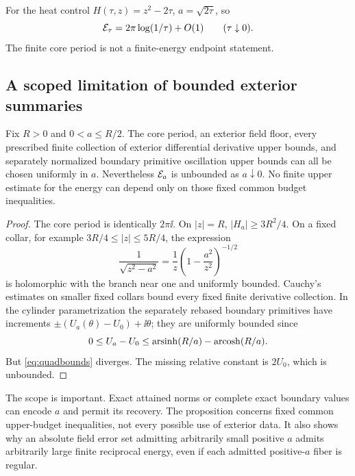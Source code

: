 For the heat control $H(\tau,z)=z^2-2\tau$, $a=\sqrt{2\tau}$, so
\begin{equation}\label{eq:quadheat}
 \mathcal E_\tau=2\pi\log(1/\tau)+O(1)
 \qquad(\tau\downarrow0).
\end{equation}
The finite core period is not a finite-energy endpoint statement.

\subsection{A scoped limitation of bounded exterior summaries}
\begin{proposition}\label{prop:compression}
Fix $R>0$ and $0<a\le R/2$. The core period, an exterior field floor,
every prescribed finite collection of exterior differential derivative
upper bounds, and separately normalized boundary primitive oscillation
upper bounds can all be chosen uniformly in $a$. Nevertheless $\mathcal E_a$
is unbounded as $a\downarrow0$. No finite upper estimate for the energy
can depend only on those fixed common budget inequalities.
\end{proposition}
\begin{proof}
The core period is identically $2\pi\ii$. On $|z|=R$,
$|H_a|\ge3R^2/4$. On a fixed collar, for example
$3R/4\le|z|\le5R/4$, the expression
\[
 \frac1{\sqrt{z^2-a^2}}=\frac1z
       \left(1-\frac{a^2}{z^2}\right)^{-1/2}
\]
is holomorphic with the branch near one and uniformly bounded.
Cauchy's estimates on smaller fixed collars bound every fixed finite
derivative collection. In the cylinder parametrization the separately
rebased boundary primitives have increments
$\pm(U_a(\theta)-U_0)+\ii\theta$; they are uniformly bounded since
\[
 0\le U_a-U_0\le\operatorname{arsinh}(R/a)-\operatorname{arcosh}(R/a).
\]
But \eqref{eq:quadbounds} diverges. The missing relative constant is
$2U_0$, which is unbounded.
\end{proof}

The scope is important. Exact attained norms or complete exact boundary
values can encode $a$ and permit its recovery. The proposition concerns
fixed common upper-budget inequalities, not every possible use of exterior
data. It also shows why an absolute field error set admitting arbitrarily
small positive $a$ admits arbitrarily large finite reciprocal energy,
even if each admitted positive-$a$ fiber is regular.


